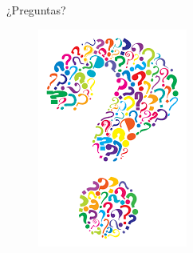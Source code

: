 \documentclass[10pt]{beamer}
\begin{document}
\begin{frame}[standout]
	\LARGE{¿Preguntas?}
	\vspace{10px}
	\begin{figure}
		\includegraphics[scale=0.5]{./Imagenes/preguntas.png}
	\end{figure}
\end{frame}
\end{document}
